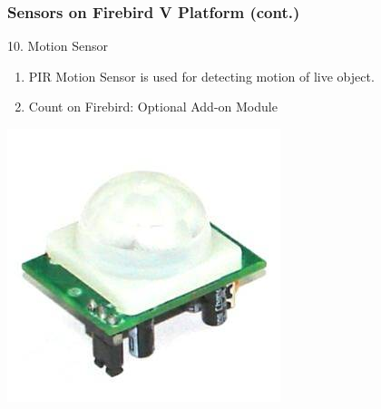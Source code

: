 \documentclass[10pt,red]{beamer}
\begin{document}
\begin{frame}
	\frametitle{Sensors on Firebird V Platform (cont.)} 
	10. Motion Sensor	\pause
		\vfill
		\begin{minipage}[c]{0.5\textwidth}
			\begin{enumerate}
				\item <+-|alert@+> PIR Motion Sensor is used for detecting motion of live object. \\[10pt]
				\item <+-|alert@+> Count on Firebird: Optional Add-on Module
			\end{enumerate}
		\end{minipage}
		\hfill
		\begin{minipage}[c]{0.4\textwidth}
			\includegraphics[width=\linewidth]{PIR_motion}
		\end{minipage}	
\end{frame}
\end{document}
